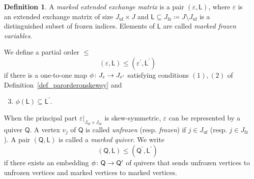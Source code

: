 \documentclass[11pt]{amsart}
\numberwithin{equation}{section}
\theoremstyle{plain}
\theoremstyle{definition}
\newtheorem{definition}[theorem]{Definition}
\def\to{\mathchoice{\longrightarrow}{\rightarrow}{\rightarrow}{\rightarrow}}
\numberwithin{equation}{section}
\begin{document}
\begin{definition}\label{def_labeledexexm}
A \emph{marked extended exchange matrix} is a pair $(\varepsilon, \mathsf{L})$, where $\varepsilon$ is an extended exchange matrix of size $J_\mathrm{uf} \times J$ and $\mathsf{L} \subseteq J_\mathrm{fz} \coloneqq J \setminus J_\mathrm{uf}$ is a distinguished subset of frozen indices. Elements of $\mathsf{L}$ are called \emph{marked frozen variables}. 

We define a partial order $\leq$
\begin{equation}\label{equ_partialorderlabel}
(\varepsilon, \mathsf{L}) \leq (\varepsilon^\prime, \mathsf{L}^\prime)
\end{equation}
if there is a one-to-one map $\phi \colon J_{\varepsilon} \to J_{\varepsilon^\prime}$ satisfying conditions $(1), (2)$ of Definition~\ref{def_parorderonskewsy} and 
\begin{enumerate}
\setcounter{enumi}{2}
\item $\phi(\mathsf{L}) \subseteq \mathsf{L}^\prime$.
\end{enumerate}
\end{definition}

When the principal part $\varepsilon |_{J_\mathrm{uf} \times J_\mathrm{uf}}$ is skew-symmetric, $\varepsilon$ can be represented by a quiver $\mathsf{Q}$. A vertex $v_j$ of $\mathsf{Q}$ is called \emph{unfrozen} (resp. \emph{frozen}) if $j \in J_\mathrm{uf}$ (resp. $j \in J_\mathrm{fz}$). A pair $(\mathsf{Q}, \mathsf{L})$ is called a \emph{marked quiver}. We write
$$
(\mathsf{Q}, \mathsf{L}) \leq (\mathsf{Q}^\prime, \mathsf{L}^\prime)
$$
if there exists an embedding $\phi \colon \mathsf{Q} \to \mathsf{Q}^\prime$ of quivers that sends unfrozen vertices to unfrozen vertices and marked vertices to marked vertices.
\end{document}
